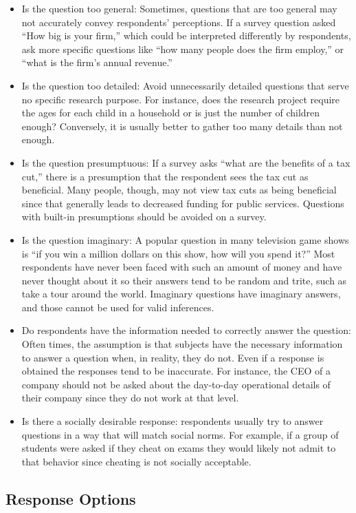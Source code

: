 \begin{itemize}
	\item Is the question too general: Sometimes, questions that are too general may not accurately convey respondents' perceptions. If a survey question asked ``How big is your firm,'' which could be interpreted differently by respondents, ask more specific questions like ``how many people does the firm employ,'' or ``what is the firm's annual revenue.''
	\item Is the question too detailed: Avoid unnecessarily detailed questions that serve no specific research purpose. For instance, does the research project require the ages for each child in a household or is just the number of children enough? Conversely, it is usually better to gather too many details than not enough.
	\item Is the question presumptuous: If a survey asks ``what are the benefits of a tax cut,'' there is a presumption that the respondent sees the tax cut as beneficial. Many people, though, may not view tax cuts as being beneficial since that generally leads to decreased funding for public services. Questions with built-in presumptions should be avoided on a survey.
	\item Is the question imaginary: A popular question in many television game shows is ``if you win a million dollars on this show, how will you spend it?'' Most respondents have never been faced with such an amount of money and have never thought about it so their answers tend to be random and trite, such as take a tour around the world. Imaginary questions have imaginary answers, and those cannot be used for valid inferences.
	\item Do respondents have the information needed to correctly answer the question: Often times, the assumption is that subjects have the necessary information to answer a question when, in reality, they do not. Even if a response is obtained the responses tend to be inaccurate. For instance, the CEO of a company should not be asked about the day-to-day operational details of their company since they do not work at that level.
	\item Is there a socially desirable response: respondents usually try to answer questions in a way that will match social norms. For example, if a group of students were asked if they cheat on exams they would likely not admit to that behavior since cheating is not socially acceptable. 
\end{itemize}

\subsection{Response Options}

